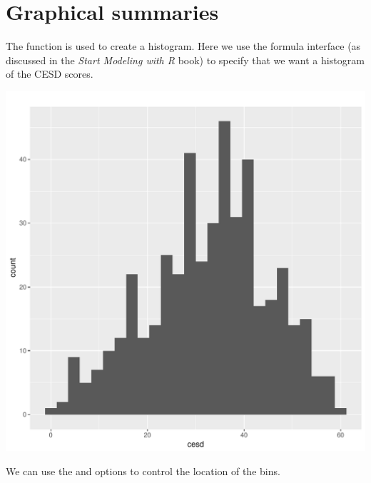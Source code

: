 \section{Graphical summaries}
The  function is used to create a histogram. Here we use the formula interface (as discussed in the \emph{Start Modeling with R} book) to specify that we want a histogram of the CESD scores.

%
\vspace{-4mm}
\begin{center}
\begin{knitrout}
\color{fgcolor}
\includegraphics[width=\maxwidth]{figure/cesd-hist-1} 

\end{knitrout}
\end{center}

We can use the  and  options to control the location of the bins.

